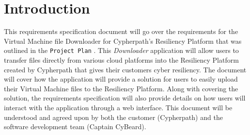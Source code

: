 \documentclass{article}
\begin{document}
    


    \tableofcontents
    \newpage
    \listoffigures


    \newpage
    \begin{versionhistory}
    \end{versionhistory}
    \newpage


    \section{Introduction}
    This requirements specification document will go over the requirements for the Virtual Machine file Downloader for Cypherpath's Resiliency Platform \cite{cypherpath} that was outlined in the
    \texttt{Project Plan} \cite{projectplan}. This \textit{Downloader} application will allow users to transfer files directly from various cloud platforms into the Resiliency Platform
    created by Cypherpath that gives their customers cyber resiliency.
    The document will cover how the application will provide a solution for users to easily upload their Virtual Machine files to the Resiliency Platform.
    Along with covering the solution, the requirements specification will also provide details on how users will interact with the application through a web interface.
    This document will be understood and agreed upon by both the customer (Cypherpath) and the software development team (Captain CyBeard).
\end{document}
